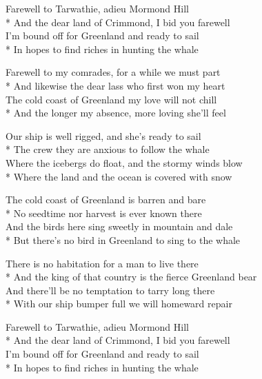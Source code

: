 

\versemark
Farewell to Tarwathie, adieu Mormond Hill\\*
And the dear land of Crimmond, I bid you farewell\\
I’m bound off for Greenland and ready to sail\\*
In hopes to find riches in hunting the whale

\versemark
Farewell to my comrades, for a while we must part\\*
And likewise the dear lass who first won my heart\\
The cold coast of Greenland my love will not chill\\*
And the longer my absence, more loving she’ll feel

\versemark
Our ship is well rigged, and she’s ready to sail\\*
The crew they are anxious to follow the whale\\
Where the icebergs do float, and the stormy winds blow\\*
Where the land and the ocean is covered with snow

\versemark
The cold coast of Greenland is barren and bare\\*
No seedtime nor harvest is ever known there\\
And the birds here sing sweetly in mountain and dale\\*
But there’s no bird in Greenland to sing to the whale

\versemark
There is no habitation for a man to live there\\*
And the king of that country is the fierce Greenland bear\\
And there’ll be no temptation to tarry long there\\*
With our ship bumper full we will homeward repair

\versemark
Farewell to Tarwathie, adieu Mormond Hill\\*
And the dear land of Crimmond, I bid you farewell\\
I’m bound off for Greenland and ready to sail\\*
In hopes to find riches in hunting the whale

